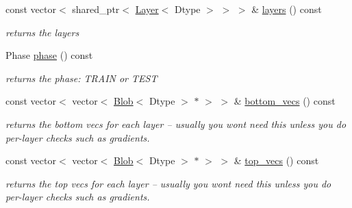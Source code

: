 \begin{DoxyCompactItemize}
\mbox{\label{classcaffe_1_1_net_a174e8bb96b67f423f8c405dac2334a5a}} 
const vector$<$ shared\+\_\+ptr$<$ \mbox{\hyperlink{classcaffe_1_1_layer}{Layer}}$<$ Dtype $>$ $>$ $>$ \& \mbox{\hyperlink{classcaffe_1_1_net_a174e8bb96b67f423f8c405dac2334a5a}{layers}} () const
\begin{DoxyCompactList}\small\item\em returns the layers \end{DoxyCompactList}\item 
\mbox{\label{classcaffe_1_1_net_a9418aee447ff6e847fd1a5e7be3d7a44}} 
Phase \mbox{\hyperlink{classcaffe_1_1_net_a9418aee447ff6e847fd1a5e7be3d7a44}{phase}} () const
\begin{DoxyCompactList}\small\item\em returns the phase\+: T\+R\+A\+IN or T\+E\+ST \end{DoxyCompactList}\item 
\mbox{\label{classcaffe_1_1_net_a25c25c31ddf7a78c7dfded318798764c}} 
const vector$<$ vector$<$ \mbox{\hyperlink{classcaffe_1_1_blob}{Blob}}$<$ Dtype $>$ $\ast$ $>$ $>$ \& \mbox{\hyperlink{classcaffe_1_1_net_a25c25c31ddf7a78c7dfded318798764c}{bottom\+\_\+vecs}} () const
\begin{DoxyCompactList}\small\item\em returns the bottom vecs for each layer -- usually you won\textquotesingle{}t need this unless you do per-\/layer checks such as gradients. \end{DoxyCompactList}\item 
\mbox{\label{classcaffe_1_1_net_ad9aace0b6b268d391101f0ce31be9fd1}} 
const vector$<$ vector$<$ \mbox{\hyperlink{classcaffe_1_1_blob}{Blob}}$<$ Dtype $>$ $\ast$ $>$ $>$ \& \mbox{\hyperlink{classcaffe_1_1_net_ad9aace0b6b268d391101f0ce31be9fd1}{top\+\_\+vecs}} () const
\begin{DoxyCompactList}\small\item\em returns the top vecs for each layer -- usually you won\textquotesingle{}t need this unless you do per-\/layer checks such as gradients. \end{DoxyCompactList}\item 
\mbox{\label{classcaffe_1_1_net_a8e42b5eba7886385d2d4b6f457314968}} 

\end{DoxyCompactItemize}
